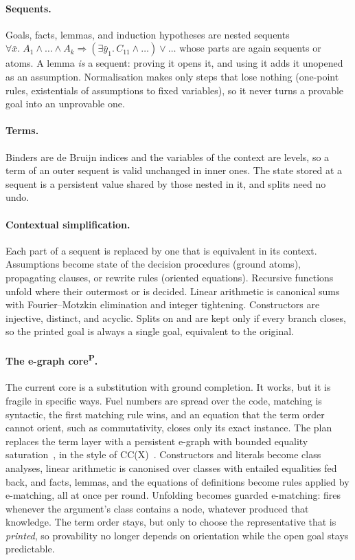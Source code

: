 \documentclass[11pt,a4paper]{article}
\newcommand{\code}[1]{\texttt{\detokenize{#1}}}
\newcommand{\planned}{\textsuperscript{\textsf{\scriptsize P}}}
\begin{document}
\paragraph{Sequents.}
Goals, facts, lemmas, and induction hypotheses are nested sequents
$\forall \bar x.\; A_1 \wedge \dots \wedge A_k \Rightarrow
  (\exists \bar y_1.\, C_{11} \wedge \dots) \vee \dots$
whose parts are again sequents or atoms. A lemma \emph{is} a sequent: proving it opens it,
and using it adds it unopened as an assumption. Normalisation makes only steps that lose
nothing (one-point rules, existentials of assumptions to fixed variables), so it never turns
a provable goal into an unprovable one.

\paragraph{Terms.}
Binders are de Bruijn indices and the variables of the context are levels, so a term of an
outer sequent is valid unchanged in inner ones. The state stored at a sequent is a persistent
value shared by those nested in it, and splits need no undo.

\paragraph{Contextual simplification.}
Each part of a sequent is replaced by one that is equivalent in its context. Assumptions
become state of the decision procedures (ground atoms), propagating clauses, or rewrite
rules (oriented equations). Recursive functions unfold where their outermost \code{match}
or \code{if} is decided. Linear arithmetic is canonical sums with Fourier--Motzkin
elimination and integer tightening. Constructors are injective, distinct, and acyclic.
Splits on \code{if} and \code{match} are kept only if every branch closes, so the printed goal
is always a single goal, equivalent to the original.

\paragraph{The e-graph core\planned.}
The current core is a substitution with ground completion. It works, but it is fragile in
specific ways. Fuel numbers are spread over the code, matching is syntactic, the first
matching rule wins, and an equation that the term order cannot orient, such as commutativity,
closes only its exact instance. The plan replaces the term layer with a persistent e-graph
with bounded equality saturation~\cite{willsey2021egg}, in the style of
CC(X)~\cite{conchon2008ccx,nelson1979,shostak1984}. Constructors and literals become class
analyses, linear arithmetic is canonised over classes with entailed equalities fed back, and
facts, lemmas, and the equations of definitions become rules applied by e-matching, all at
once per round. Unfolding becomes guarded e-matching: \code{size(Cons(x, xs))} fires
whenever the argument's class contains a \code{Cons} node, whatever produced that knowledge.
The term order stays, but only to choose the representative that is \emph{printed}, so
provability no longer depends on orientation while the open goal stays predictable.
\end{document}
